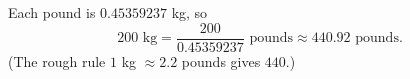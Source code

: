 Each pound is $0.45359237$ kg, so
\[
200\text{ kg}=\dfrac{200}{0.45359237}\text{ pounds}\approx\boxed{440.92}\text{ pounds}.
\]
(The rough rule $1$ kg $\approx2.2$ pounds gives $440$.)
